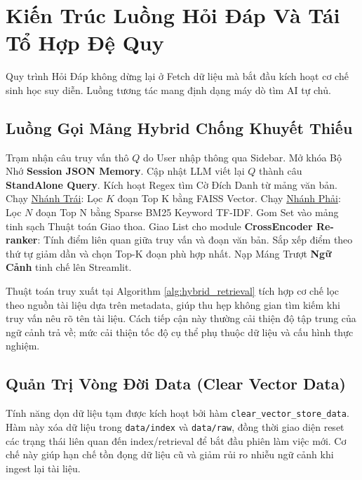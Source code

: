 \documentclass[10pt, conference, a4paper, compsocconf]{IEEEtran}
\begin{document}
\section{Kiến Trúc Luồng Hỏi Đáp Và Tái Tổ Hợp Đệ Quy}

Quy trình Hỏi Đáp không dừng lại ở Fetch dữ liệu mà bắt đầu kích hoạt cơ chế sinh học suy diễn. Luồng tương tác mang định dạng máy dò tìm AI tự chủ.

\subsection{Luồng Gọi Mảng Hybrid Chống Khuyết Thiếu}

\begin{algorithm}[!htb]
\caption{Cơ chế Truy xuất Bối cảnh Tri Thức Đa Tầng Hybrid Auto-Retrieval Architecture}
\begin{algorithmic}[1]
\STATE Trạm nhận câu truy vấn thô $Q$ do User nhập thông qua Sidebar.
    \STATE Mở khóa Bộ Nhớ \textbf{Session JSON Memory}.
    \STATE Cập nhật LLM viết lại $Q$ thành câu \textbf{StandAlone Query}.
\ENDIF
\STATE Kích hoạt Regex tìm Cờ Đích Danh từ mảng văn bản.
\STATE Chạy \underline{Nhánh Trái}: Lọc $K$ đoạn Top K bằng FAISS Vector.
\STATE Chạy \underline{Nhánh Phải}: Lọc $N$ đoạn Top N bằng Sparse BM25 Keyword TF-IDF.
\STATE Gom Set vào mảng tinh sạch Thuật toán Giao thoa.
\STATE Giao List cho module \textbf{CrossEncoder Re-ranker}:
  \STATE Tính điểm liên quan giữa truy vấn và đoạn văn bản.
\ENDFOR
\STATE Sắp xếp điểm theo thứ tự giảm dần và chọn Top-K đoạn phù hợp nhất.
\STATE Nạp Máng Trượt \textbf{Ngữ Cảnh} tinh chế lên Streamlit.
\end{algorithmic}
\label{alg:hybrid_retrieval}
\end{algorithm}

Thuật toán truy xuất tại Algorithm \ref{alg:hybrid_retrieval} tích hợp cơ chế lọc theo nguồn tài liệu dựa trên metadata, giúp thu hẹp không gian tìm kiếm khi truy vấn nêu rõ tên tài liệu. Cách tiếp cận này thường cải thiện độ tập trung của ngữ cảnh trả về; mức cải thiện tốc độ cụ thể phụ thuộc dữ liệu và cấu hình thực nghiệm.

\subsection{Quản Trị Vòng Đời Data (Clear Vector Data)}
Tính năng dọn dữ liệu tạm được kích hoạt bởi hàm \texttt{clear\_vector\_store\_data}. Hàm này xóa dữ liệu trong \texttt{data/index} và \texttt{data/raw}, đồng thời giao diện reset các trạng thái liên quan đến index/retrieval để bắt đầu phiên làm việc mới. Cơ chế này giúp hạn chế tồn đọng dữ liệu cũ và giảm rủi ro nhiễu ngữ cảnh khi ingest lại tài liệu.
\end{document}

